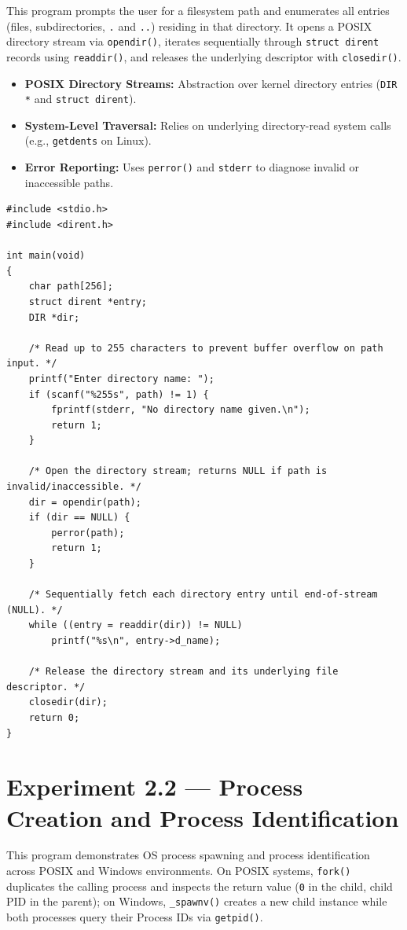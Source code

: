 \documentclass[11pt,a4paper]{article}
\newcommand{\exptheader}[3]{%
    \section[#1: #2]{#1 --- #2}%
    \label{#3}%
}
\begin{document}
This program prompts the user for a filesystem path and enumerates all entries (files, subdirectories, \texttt{.} and \texttt{..}) residing in that directory. It opens a POSIX directory stream via \texttt{opendir()}, iterates sequentially through \texttt{struct dirent} records using \texttt{readdir()}, and releases the underlying descriptor with \texttt{closedir()}.

\begin{itemize}
    \item \textbf{POSIX Directory Streams:} Abstraction over kernel directory entries (\texttt{DIR *} and \texttt{struct dirent}).
    \item \textbf{System-Level Traversal:} Relies on underlying directory-read system calls (e.g., \texttt{getdents} on Linux).
    \item \textbf{Error Reporting:} Uses \texttt{perror()} and \texttt{stderr} to diagnose invalid or inaccessible paths.
\end{itemize}

\begin{lstlisting}[title={\texttt{expt\_2\_1.c}}]
#include <stdio.h>
#include <dirent.h>

int main(void)
{
    char path[256];
    struct dirent *entry;
    DIR *dir;

    /* Read up to 255 characters to prevent buffer overflow on path input. */
    printf("Enter directory name: ");
    if (scanf("%255s", path) != 1) {
        fprintf(stderr, "No directory name given.\n");
        return 1;
    }

    /* Open the directory stream; returns NULL if path is invalid/inaccessible. */
    dir = opendir(path);
    if (dir == NULL) {
        perror(path);
        return 1;
    }

    /* Sequentially fetch each directory entry until end-of-stream (NULL). */
    while ((entry = readdir(dir)) != NULL)
        printf("%s\n", entry->d_name);

    /* Release the directory stream and its underlying file descriptor. */
    closedir(dir);
    return 0;
}
\end{lstlisting}

\exptheader{Experiment 2.2}{Process Creation and Process Identification}{exp:2.2}

This program demonstrates OS process spawning and process identification across POSIX and Windows environments. On POSIX systems, \texttt{fork()} duplicates the calling process and inspects the return value (\texttt{0} in the child, child PID in the parent); on Windows, \texttt{\_spawnv()} creates a new child instance while both processes query their Process IDs via \texttt{getpid()}.
\end{document}

